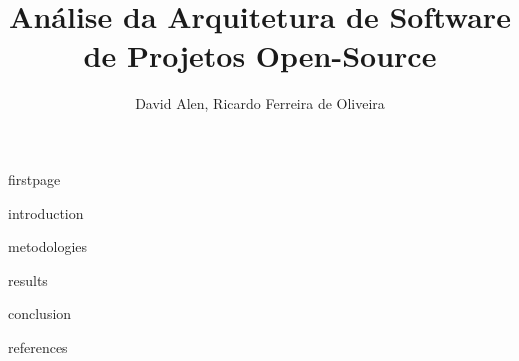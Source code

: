 \documentclass[12pt]{article}
\title{Análise da Arquitetura de Software de Projetos Open-Source}
\author{David Alen\inst{1}, Ricardo Ferreira de Oliveira\inst{1}}
\begin{document}
{firstpage}

{introduction}

{metodologies}

{results}

{conclusion}

{references}
\end{document}
